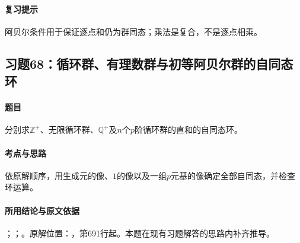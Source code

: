 \paragraph{复习提示}

阿贝尔条件用于保证逐点和仍为群同态；乘法是复合，不是逐点相乘。



\subsection{习题68：循环群、有理数群与初等阿贝尔群的自同态环}

\label{ex:3:68}

\paragraph{题目}

分别求$\mathbb Z^+$、无限循环群、$\mathbb Q^+$及$n$个$p$阶循环群的直和的自同态环。

\paragraph{考点与思路}

依原解顺序，用生成元的像、$1$的像以及一组$p$元基的像确定全部自同态，并检查环运算。

\paragraph{所用结论与原文依据}

；；。原解位置：，第691行起。本题在现有习题解答的思路内补齐推导。


